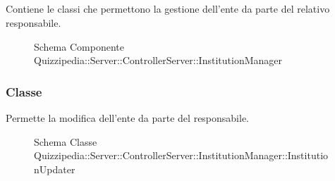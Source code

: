 \subsection{}
Contiene le classi che permettono la gestione dell'ente da parte del relativo responsabile.
\begin{figure}[H]
\centering
\noindent{}
\caption[Schema Componente Quizzipedia::Server::ControllerServer::InstitutionManager]{Schema Componente Quizzipedia::Server::ControllerServer::InstitutionManager}
\end{figure}
\subsubsection{Classe }
Permette la modifica dell'ente da parte del responsabile.
\begin{figure}[H]
\centering
\noindent{}
\caption[Schema Classe InstitutionUpdater]{Schema Classe Quizzipedia::Server::ControllerServer::InstitutionManager::InstitutionUpdater}
\end{figure}
